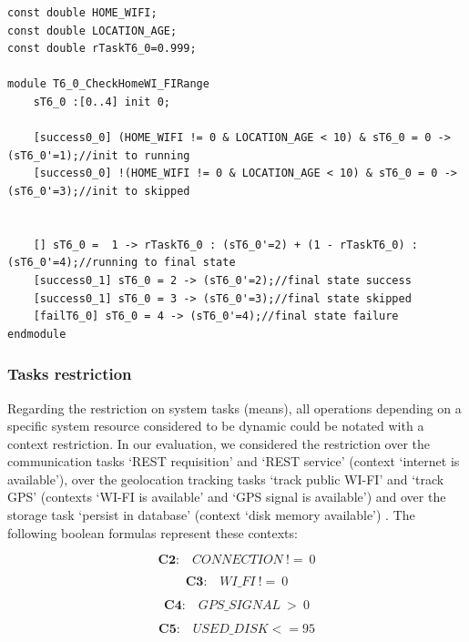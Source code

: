 \begin{lstlisting}[language=Prism, caption={Variable declaration and corresponding module with a context activation formula.},label={lst:PRISM_CTX_GOAL}]
const double HOME_WIFI;
const double LOCATION_AGE;
const double rTaskT6_0=0.999;

module T6_0_CheckHomeWI_FIRange
	sT6_0 :[0..4] init 0;
	
	[success0_0] (HOME_WIFI != 0 & LOCATION_AGE < 10) & sT6_0 = 0 -> (sT6_0'=1);//init to running
	[success0_0] !(HOME_WIFI != 0 & LOCATION_AGE < 10) & sT6_0 = 0 -> (sT6_0'=3);//init to skipped


	[] sT6_0 =  1 -> rTaskT6_0 : (sT6_0'=2) + (1 - rTaskT6_0) : (sT6_0'=4);//running to final state
	[success0_1] sT6_0 = 2 -> (sT6_0'=2);//final state success
	[success0_1] sT6_0 = 3 -> (sT6_0'=3);//final state skipped
	[failT6_0] sT6_0 = 4 -> (sT6_0'=4);//final state failure
endmodule
\end{lstlisting}

\subsubsection{Tasks restriction}

Regarding the restriction on system tasks (means), all operations depending on a specific system resource considered to be dynamic could be notated with a context restriction. In our evaluation, we considered the restriction over the communication tasks `REST requisition' and `REST service' (context `internet is available'), over the geolocation tracking tasks `track public WI-FI' and `track GPS' (contexts `WI-FI is available' and `GPS signal is available') and over the storage task `persist in database' (context `disk memory available') . The following boolean formulas represent these contexts: 

\begin{equation}\label{eq:C2}
\textbf{C2:}\quad CONNECTION\ !=\ 0 
\end{equation}

\begin{equation}\label{eq:C3}
\textbf{C3:}\quad WI\_FI\ !=\ 0
\end{equation}

\begin{equation}\label{eq:C4}
\textbf{C4:}\quad GPS\_SIGNAL\ >\ 0
\end{equation}

\begin{equation}\label{eq:C5}
\textbf{C5:}\quad USED\_DISK <= 95
\end{equation}

